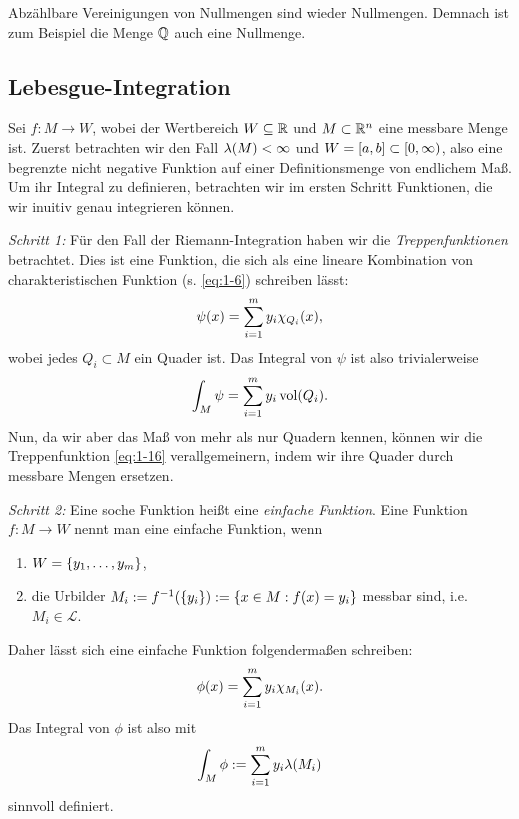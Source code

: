 \begin{remark}\label{rem:1-5}
	Abzählbare Vereinigungen von Nullmengen sind wieder Nullmengen.
	Demnach ist zum Beispiel die Menge \(\Q\) auch eine Nullmenge.
\end{remark}


\subsection{Lebesgue-Integration}

Sei \(f: M \to W\), wobei der Wertbereich \(W \subseteq \R\) und \(M \subset \R^n\) eine messbare Menge ist.
Zuerst betrachten wir den Fall \(\lambda\parentheses*{M} < \infty\) und \(W = \brackets*{a, b} \subset \left[0, \infty\right)\), also eine begrenzte nicht negative Funktion auf einer Definitionsmenge von endlichem Maß.
Um ihr Integral zu definieren, betrachten wir im ersten Schritt Funktionen, die wir inuitiv genau integrieren können.

\emph{Schritt 1:} Für den Fall der Riemann-Integration haben wir die \emph{Treppenfunktionen} betrachtet.
Dies ist eine Funktion, die sich als eine lineare Kombination von charakteristischen Funktion (s. \eqref{eq:1-6}) schreiben lässt:
\begin{equation}\label{eq:1-16}
	\psi\parentheses*{x} = \sum_{i = 1}^m y_i \chi_{Q_i}\parentheses*{x},
\end{equation}
wobei jedes \(Q_i \subset M\) ein Quader ist.
Das Integral von \(\psi\) ist also trivialerweise
\begin{equation}
	\int_M \psi = \sum_{i = 1}^m y_i \vol\parentheses*{Q_i}.
\end{equation}
Nun, da wir aber das Maß von mehr als nur Quadern kennen, können wir die Treppenfunktion \eqref{eq:1-16} verallgemeinern, indem wir ihre Quader durch messbare Mengen ersetzen.

\emph{Schritt 2:} Eine soche Funktion heißt eine \emph{einfache Funktion}.
Eine Funktion \(f: M \to W\) nennt man eine einfache Funktion, wenn
\begin{enumerate}
	\item \(W = \braces*{y_1, \ldots, y_m}\),
	\item die Urbilder \(M_i := f^{-1}\parentheses*{\braces*{y_i}} := \braces*{x \in M : f\parentheses*{x} = y_i}\) messbar sind, i.e. \(M_i \in \mathcal{L}\).
\end{enumerate}
Daher lässt sich eine einfache Funktion folgendermaßen schreiben:
\begin{equation}
	\phi\parentheses*{x} = \sum_{i = 1}^m y_i \chi_{M_i}\parentheses*{x}.
\end{equation}
Das Integral von \(\phi\) ist also mit
\begin{equation}\label{eq:1-19}
	\int_M \phi := \sum_{i = 1}^m y_i \lambda\parentheses*{M_i}
\end{equation}
sinnvoll definiert.

